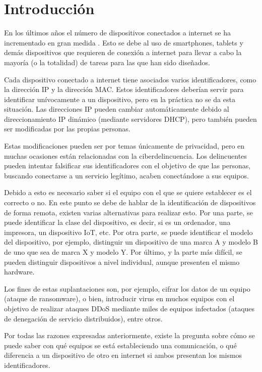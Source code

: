 
\chapter{Introducción} \label{chap:intro}

En los últimos años el número de dispositivos conectados a internet se ha incrementado en gran medida \cite{84Billio53:online}. Esto se debe al uso de smartphones, tablets y demás dispositivos que requieren de conexión a internet para llevar a cabo la mayoría (o la totalidad) de tareas para las que han sido diseñados.

Cada dispositivo conectado a internet tiene asociados varios identificadores, como la dirección IP y la dirección MAC. Estos identificadores deberían servir para identificar unívocamente a un dispositivo, pero en la práctica no se da esta situación. Las direcciones IP pueden cambiar automáticamente debido al direccionamiento IP dinámico (mediante servidores DHCP), pero también pueden ser modificadas por las propias personas. 

Estas modificaciones pueden ser por temas únicamente de privacidad, pero en muchas ocasiones están relacionadas con la ciberdelincuencia. Los delincuentes pueden intentar falsificar sus identificadores con el objetivo de que las personas, buscando conectarse a un servicio legítimo, acaben conectándose a sus equipos.

Debido a esto es necesario saber si el equipo con el que se quiere establecer es el correcto o no. En este punto se debe de hablar de la identificación de dispositivos de forma remota, existen varias alternativas para realizar esto. Por una parte, se puede identificar la clase del dispositivo, es decir, si es un ordenador, una impresora, un dispositivo IoT, etc. Por otra parte, se puede identificar el modelo del dispositivo, por ejemplo, distinguir un dispositivo de una marca A y modelo B de uno que sea de marca X y modelo Y. Por último, y la parte más difícil, se pueden distinguir dispositivos a nivel individual, aunque presenten el mismo hardware.

Los fines de estas suplantaciones son, por ejemplo, cifrar los datos de un equipo (ataque de ransomware), o bien, introducir virus en muchos equipos con el objetivo de realizar ataques DDoS mediante miles de equipos infectados (ataques de denegación de servicio distribuidos), entre otros.

Por todas las razones expresadas anteriormente, existe la pregunta sobre cómo se puede saber con qué equipos se está estableciendo una comunicación, o qué diferencia a un dispositivo de otro en internet si ambos presentan los mismos identificadores.

